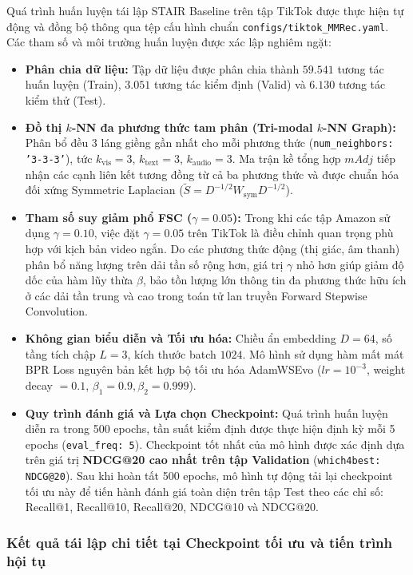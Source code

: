 Quá trình huấn luyện tái lập STAIR Baseline trên tập TikTok được thực hiện tự động và đồng bộ thông qua tệp cấu hình chuẩn \texttt{configs/tiktok\_MMRec.yaml}. Các tham số và môi trường huấn luyện được xác lập nghiêm ngặt:
\begin{itemize}[leftmargin=*]
    \item \textbf{Phân chia dữ liệu:} Tập dữ liệu được phân chia thành $59.541$ tương tác huấn luyện (Train), $3.051$ tương tác kiểm định (Valid) và $6.130$ tương tác kiểm thử (Test).
    \item \textbf{Đồ thị $k$-NN đa phương thức tam phân (Tri-modal $k$-NN Graph):} Phân bổ đều $3$ láng giềng gần nhất cho mỗi phương thức (\texttt{num\_neighbors: '3-3-3'}), tức $k_{\text{vis}} = 3$, $k_{\text{text}} = 3$, $k_{\text{audio}} = 3$. Ma trận kề tổng hợp $mAdj$ tiếp nhận các cạnh liên kết tương đồng từ cả ba phương thức và được chuẩn hóa đối xứng Symmetric Laplacian ($\tilde{S} = D^{-1/2} W_{\text{sym}} D^{-1/2}$).
    \item \textbf{Tham số suy giảm phổ FSC ($\gamma = 0.05$):} Trong khi các tập Amazon sử dụng $\gamma = 0.10$, việc đặt $\gamma = 0.05$ trên TikTok là điều chỉnh quan trọng phù hợp với kịch bản video ngắn. Do các phương thức động (thị giác, âm thanh) phân bổ năng lượng trên dải tần số rộng hơn, giá trị $\gamma$ nhỏ hơn giúp giảm độ dốc của hàm lũy thừa $\beta$, bảo tồn lượng lớn thông tin đa phương thức hữu ích ở các dải tần trung và cao trong toán tử lan truyền Forward Stepwise Convolution.
    \item \textbf{Không gian biểu diễn và Tối ưu hóa:} Chiều ẩn embedding $D = 64$, số tầng tích chập $L = 3$, kích thước batch $1024$. Mô hình sử dụng hàm mất mát BPR Loss nguyên bản kết hợp bộ tối ưu hóa AdamWSEvo ($lr = 10^{-3}$, weight decay $= 0.1$, $\beta_1 = 0.9, \beta_2 = 0.999$).
    \item \textbf{Quy trình đánh giá và Lựa chọn Checkpoint:} Quá trình huấn luyện diễn ra trong 500 epochs, tần suất kiểm định được thực hiện định kỳ mỗi 5 epochs (\texttt{eval\_freq: 5}). Checkpoint tốt nhất của mô hình được xác định dựa trên giá trị \textbf{NDCG@20 cao nhất trên tập Validation} (\texttt{which4best: NDCG@20}). Sau khi hoàn tất 500 epochs, mô hình tự động tải lại checkpoint tối ưu này để tiến hành đánh giá toàn diện trên tập Test theo các chỉ số: Recall@1, Recall@10, Recall@20, NDCG@10 và NDCG@20.
\end{itemize}

\subsubsection{Kết quả tái lập chi tiết tại Checkpoint tối ưu và tiến trình hội tụ}

